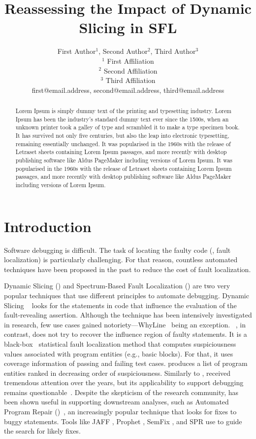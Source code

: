 \documentclass{article}
\title{Reassessing the Impact of Dynamic Slicing in SFL}
\author{
First Author$^1$,
Second Author$^2$,
Third Author$^3$
\\ 
$^1$ First Affiliation\\
$^2$ Second Affiliation\\
$^3$ Third Affiliation\\
%
first@email.address,
second@email.address,
third@email.address
}
\begin{document}
\maketitle

\begin{abstract}
Lorem Ipsum is simply dummy text of the printing and typesetting industry. Lorem Ipsum has been the industry's standard dummy text ever since the 1500s, when an unknown printer took a galley of type and scrambled it to make a type specimen book. It has survived not only five centuries, but also the leap into electronic typesetting, remaining essentially unchanged. It was popularised in the 1960s with the release of Letraset sheets containing Lorem Ipsum passages, and more recently with desktop publishing software like Aldus PageMaker including versions of Lorem Ipsum. It was popularised in the 1960s with the release of Letraset sheets containing Lorem Ipsum passages, and more recently with desktop publishing software like Aldus PageMaker including versions of Lorem Ipsum.
\end{abstract}

\section{Introduction}

Software debugging is difficult. The task of locating the faulty code
(\ie{}, fault localization) is particularly challenging. For that
reason, countless automated techniques have been proposed in the past
to reduce the cost of fault localization.

Dynamic Slicing (\ds{}) and Spectrum-Based Fault Localization (\sfl{})
are two very popular techniques that use different principles to
automate debugging. Dynamic Slicing ~\citeauthor{Agrawal:1990:DPS:93542.93576} looks for the statements
in code that influence the evaluation of the fault-revealing
assertion. Although the technique has been intensively investigated in
research, few use cases gained notoriety---WhyLine~\cite{Ko:2008:DRA:1368088.1368130} being an
exception.  \sfl{}~\cite{7390282}, in contrast, does not try to
recover the influence region of faulty statements. It is a black-box~
statistical fault localization method that computes suspiciousness
values associated with program entities (e.g., basic blocks). For
that, it uses coverage information of passing and failing test
cases. \sfl{} produces a list of program entities ranked in decreasing
order of suspiciousness. Similarly to \ds{}, \sfl{} received
tremendous attention over the years, but its applicability to support
debugging remains
questionable~\cite{ang-perez-van-deursen-rui-2017,Pearson:2017:EIF:3097368.3097441,Xie:2016:RAD:2884781.2884834}.
Despite the skepticism of the research community, \sfl{} has been
shown useful in supporting downstream analyses, such as Automated
Program Repair
(\apr{})~\cite{automatic-software-repair-survey2017,kim-etal-daghstul2017},
an increasingly popular technique that looks for fixes to buggy
statements. Tools like JAFF \cite{arcuri-2011}, Prophet
\cite{long-rinard-2016}, SemFix \cite{nguyen-qi-roychoudhury-2013},
and SPR \cite{long-rinard-2015} use \sfl{} to guide the search for
likely fixes.
\end{document}
